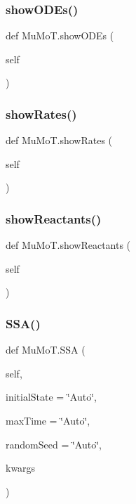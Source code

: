 \mbox{\label{namespace_mu_mo_t_a997e6d609d68d1021f69c63aca57ea98}} 
\subsubsection{\texorpdfstring{show\+O\+D\+Es()}{showODEs()}}
{\footnotesize\ttfamily def Mu\+Mo\+T.\+show\+O\+D\+Es (\begin{DoxyParamCaption}\item[{}]{self }\end{DoxyParamCaption})}

\mbox{\label{namespace_mu_mo_t_af80d70e0df74fa91a0d080b85a3b25f8}} 
\subsubsection{\texorpdfstring{show\+Rates()}{showRates()}}
{\footnotesize\ttfamily def Mu\+Mo\+T.\+show\+Rates (\begin{DoxyParamCaption}\item[{}]{self }\end{DoxyParamCaption})}

\mbox{\label{namespace_mu_mo_t_abfc09208df74b0612b5571e5156da2c8}} 
\subsubsection{\texorpdfstring{show\+Reactants()}{showReactants()}}
{\footnotesize\ttfamily def Mu\+Mo\+T.\+show\+Reactants (\begin{DoxyParamCaption}\item[{}]{self }\end{DoxyParamCaption})}

\mbox{\label{namespace_mu_mo_t_a37158edc925436266f76cbc2a74afcb9}} 
\subsubsection{\texorpdfstring{S\+S\+A()}{SSA()}}
{\footnotesize\ttfamily def Mu\+Mo\+T.\+S\+SA (\begin{DoxyParamCaption}\item[{}]{self,  }\item[{}]{initial\+State = {\ttfamily \char`\"{}Auto\char`\"{}},  }\item[{}]{max\+Time = {\ttfamily \char`\"{}Auto\char`\"{}},  }\item[{}]{random\+Seed = {\ttfamily \char`\"{}Auto\char`\"{}},  }\item[{}]{kwargs }\end{DoxyParamCaption})}

